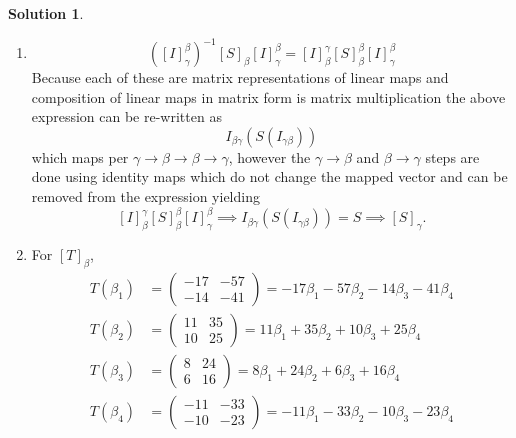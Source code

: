 \documentclass[10pt]{article}
\theoremstyle{definition}
\newtheorem{soln}{Solution}
\begin{document}
\begin{soln}~
  \begin{enumerate}
    \item $$\left(\left[I\right]_\gamma^\beta\right)^{-1}\left[S\right]_\beta\left[I\right]_\gamma^\beta
            = \left[I\right]_\beta^\gamma\left[S\right]_\beta^\beta\left[I\right]_\gamma^\beta$$
          Because each of these are matrix representations of linear maps and composition of linear maps in matrix form is matrix multiplication the above expression can be
          re-written as
          $$I_{\beta\gamma}(S(I_{\gamma\beta}))$$
          which maps per $\gamma\to\beta\to\beta\to\gamma$, however the $\gamma\to\beta$ and $\beta\to\gamma$ steps are done using identity maps which do not change the
          mapped vector and can be removed from the expression yielding
          $$\left[I\right]_\beta^\gamma\left[S\right]_\beta^\beta\left[I\right]_\gamma^\beta\implies I_{\beta\gamma}(S(I_{\gamma\beta}))=S\implies\left[S\right]_\gamma.$$
    \item For $\left[T\right]_\beta$,
          \begin{align*}
            T(\beta_1) & =\begin{pmatrix}
                            -17 & -57 \\
                            -14 & -41
                          \end{pmatrix}=-17\beta_1-57\beta_2-14\beta_3-41\beta_4 \\
            T(\beta_2) & =\begin{pmatrix}
                            11 & 35 \\
                            10 & 25
                          \end{pmatrix}=11\beta_1+35\beta_2+10\beta_3+25\beta_4  \\
            T(\beta_3) & =\begin{pmatrix}
                            8 & 24 \\
                            6 & 16
                          \end{pmatrix}=8\beta_1+24\beta_2+6\beta_3+16\beta_4    \\
            T(\beta_4) & =\begin{pmatrix}
                            -11 & -33 \\
                            -10 & -23
                          \end{pmatrix}=-11\beta_1-33\beta_2-10\beta_3-23\beta_4
          \end{align*}

\end{enumerate}
\end{soln}
\end{document}
